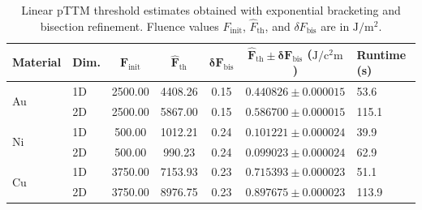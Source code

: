 \begin{table}[htbp]
    \centering
    \caption{
    Linear pTTM threshold estimates obtained with exponential bracketing and bisection refinement.
    Fluence values \(F_{\mathrm{init}}\), \(\hat{F}_{\mathrm{th}}\), and \(\delta F_{\mathrm{bis}}\) are in \(\si{\joule\per\square\metre}\).
    }
    \label{tab:ch3-threshold-linear}
    \begin{tabular}{@{}llccccl@{}}
        \toprule
        \rowcolor{gray!20}
        \textbf{Material}   & \textbf{Dim.} & \(\boldsymbol{F_{\mathrm{init}}}\) & \(\boldsymbol{\hat{F}_{\mathrm{th}}}\) & \(\boldsymbol{\delta F_{\mathrm{bis}}}\) & \(\boldsymbol{\hat{F}_{\mathrm{th}} \pm \delta F_{\mathrm{bis}}}\) (\(\si{\joule\per\square\centi\metre}\)) & \textbf{Runtime (s)} \\
        \midrule
        \multirow{2}{*}{Au} & 1D            & 2500.00                            & 4408.26                                & 0.15                                     & \(0.440826 \pm 0.000015\)                                                                                   & 53.6                 \\
                            & 2D            & 2500.00                            & 5867.00                                & 0.15                                     & \(0.586700 \pm 0.000015\)                                                                                   & 115.1                \\
        \midrule
        \multirow{2}{*}{Ni} & 1D            & 500.00                             & 1012.21                                & 0.24                                     & \(0.101221 \pm 0.000024\)                                                                                   & 39.9                 \\
                            & 2D            & 500.00                             & 990.23                                 & 0.24                                     & \(0.099023 \pm 0.000024\)                                                                                   & 62.9                 \\
        \midrule
        \multirow{2}{*}{Cu} & 1D            & 3750.00                            & 7153.93                                & 0.23                                     & \(0.715393 \pm 0.000023\)                                                                                   & 51.1                 \\
                            & 2D            & 3750.00                            & 8976.75                                & 0.23                                     & \(0.897675 \pm 0.000023\)                                                                                   & 113.9                \\
        \bottomrule
    \end{tabular}
\end{table}

